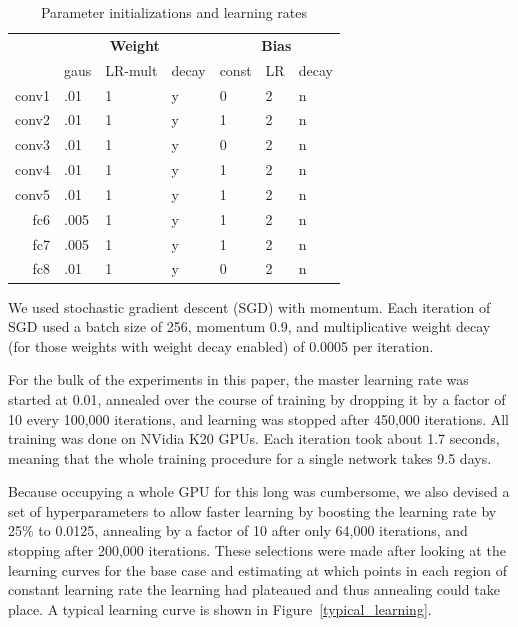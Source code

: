 \begin{table}[t]
\caption{Parameter initializations and learning rates}
\label{tab:learning_hyperparams}
\begin{center}
\begin{tabular}{|r|l|l|l|l|l|l|}
\hline
       & \multicolumn{3}{c|}{\bf Weight}     &  \multicolumn{3}{c|}{\bf Bias}       \\
\cline{2-7}
       & gaus   & LR-mult & decay &  const  & LR  & decay \\
\hline
conv1  & .01    & 1       & y     &  0      & 2   & n     \\
conv2  & .01    & 1       & y     &  1      & 2   & n     \\
conv3  & .01    & 1       & y     &  0      & 2   & n     \\
conv4  & .01    & 1       & y     &  1      & 2   & n     \\
conv5  & .01    & 1       & y     &  1      & 2   & n     \\
fc6    & .005   & 1       & y     &  1      & 2   & n     \\
fc7    & .005   & 1       & y     &  1      & 2   & n     \\
fc8    & .01    & 1       & y     &  0      & 2   & n     \\ 
\hline
\end{tabular}
\end{center}
\end{table}

We used stochastic gradient descent (SGD) with momentum. Each iteration of SGD used a batch size of 256, momentum 0.9, and multiplicative weight decay (for those weights with weight decay enabled) of 0.0005 per iteration.

For the bulk of the experiments in this paper, the master learning rate was started at 0.01, annealed over the course of training by dropping it by a factor of 10 every 100,000 iterations, and learning was stopped after 450,000 iterations. All training was done on NVidia K20 GPUs. Each iteration took about 1.7 seconds, meaning that the whole training procedure for a single network takes 9.5 days.

Because occupying a whole GPU for this long was cumbersome, we also devised a set of hyperparameters to allow faster learning by boosting the learning rate by 25\% to 0.0125, annealing by a factor of 10 after only 64,000 iterations, and stopping after 200,000 iterations. These selections were made after looking at the learning curves for the base case and estimating at which points in each region of constant learning rate the learning had plateaued and thus annealing could take place.  A typical learning curve is shown in Figure~\ref{typical_learning}.


